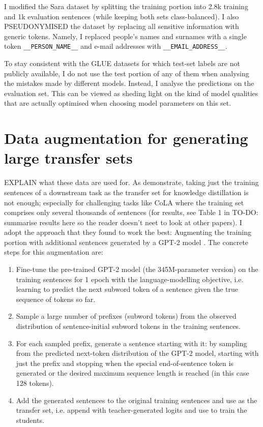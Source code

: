 \documentclass[bsc,frontabs,twoside,singlespacing,parskip,deptreport]{infthesis}
\begin{document}
{{{      I modified the Sara dataset by splitting the training portion into 2.8k training and 1k evaluation sentences (while keeping both sets class-balanced). I also PSEUDONYMISED the dataset by replacing all sensitive information with generic tokens. Namely, I replaced people's names and surnames with a single token \verb|__PERSON_NAME__| and e-mail addresses with \verb|__EMAIL_ADDRESS__|.

      To stay consistent with the GLUE datasets for which test-set labels are not publicly available, I do not use the test portion of any of them when analysing the mistakes made by different models. Instead, I analyse the predictions on the evaluation set. This can be viewed as sheding light on the kind of model qualities that are actually optimised when choosing model parameters on this set.
    }
  }

  \section{Data augmentation for generating large transfer sets}{
    EXPLAIN what these data are used for.
    As \citet{Tang_2019a} demonstrate, taking just the training sentences of a downstream task as the transfer set for knowledge distillation is not enough; especially for challenging tasks like CoLA where the training set comprises only several thousands of sentences (for results, see Table 1 in \citet{Tang_2019b} TO-DO: summarise results here so the reader doesn't neet to look at other papers). I adopt the approach that they found to work the best: Augmenting the training portion with additional sentences generated by a GPT-2 model \citep{Radford_2019}. The concrete steps for this augmentation are:
    \begin{enumerate}
      \item Fine-tune the pre-trained GPT-2 model (the 345M-parameter version) on the training sentences for 1 epoch with the language-modelling objective, i.e. learning to predict the next subword token of a sentence given the true sequence of tokens so far.
      \item Sample a large number of prefixes (subword tokens) from the observed distribution of sentence-initial subword tokens in the training sentences.
      \item For each sampled prefix, generate a sentence starting with it: by sampling from the predicted next-token distribution of the GPT-2 model, starting with just the prefix and stopping when the special end-of-sentence token is generated or the desired maximum sequence length is reached (in this case 128 tokens).
      \item Add the generated sentences to the original training sentences and use as the transfer set, i.e. append with teacher-generated logits and use to train the students.
    \end{enumerate}

}}
\end{document}
